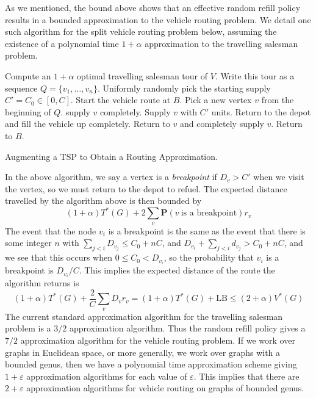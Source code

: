 \documentclass{article}
\theoremstyle{plain}
\theoremstyle{plain}
\begin{document}
As we mentioned, the bound above shows that an effective random refill policy results in a bounded approximation to the vehicle routing problem. We detail one such algorithm for the split vehicle routing problem below, assuming the existence of a polynomial time $1 + \alpha$ approximation to the travelling salesman problem.

\begin{algorithm}
\begin{algorithmic}[1]
\State Compute an $1 + \alpha$ optimal travelling salesman tour of $V$. Write this tour as a sequence $Q = \{ v_1, \dots, v_n \}$.
\State Uniformly randomly pick the starting supply $C' = C_0 \in [0,C]$.
\State Start the vehicle route at $B$.
\State Pick a new vertex $v$ from the beginning of $Q$.
 supply $v$ completely.
    \State Supply $v$ with $C'$ units.
    \State Return to the depot and fill the vehicle up completely.
    \State Return to $v$ and completely supply $v$.
\EndIf
\EndWhile
\State Return to $B$.
\end{algorithmic}
\caption{Augmenting a TSP to Obtain a Routing Approximation.}
\label{alg:TSPAugmentationSplit}
\end{algorithm}

In the above algorithm, we say a vertex is a {\it breakpoint} if $D_v > C'$ when we visit the vertex, so we must return to the depot to refuel. The expected distance travelled by the algorithm above is then bounded by
%
\[ (1 + \alpha) T^*(G) + 2 \sum_v \mathbf{P}(v\ \text{is a breakpoint}) r_v \]
%
The event that the node $v_i$ is a breakpoint is the same as the event that there is some integer $n$ with $\sum_{j < i} D_{v_j} \leq C_0 + nC$, and $D_{v_i} + \sum_{j < i} d_{v_j} > C_0 + nC$, and we see that this occurs when $0 \leq C_0 < D_{v_i}$, so the probability that $v_i$ is a breakpoint is $D_{v_i}/C$. This implies the expected distance of the route the algorithm returns is
%
\[ (1 + \alpha) T^*(G) + \frac{2}{C} \sum_v D_v r_v = (1 + \alpha) T^*(G) + \text{LB} \leq (2 + \alpha) V^*(G) \]
%
The current standard approximation algorithm for the travelling salesman problem is a $3/2$ approximation algorithm. Thus the random refill policy gives a $7/2$ approximation algorithm for the vehicle routing problem. If we work over graphs in Euclidean space, or more generally, we work over graphs with a bounded genus, then we have a polynomial time approximation scheme giving $1 + \varepsilon$ approximation algorithms for each value of $\varepsilon$. This implies that there are $2 + \varepsilon$ approximation algorithms for vehicle routing on graphs of bounded genus.
\end{document}
